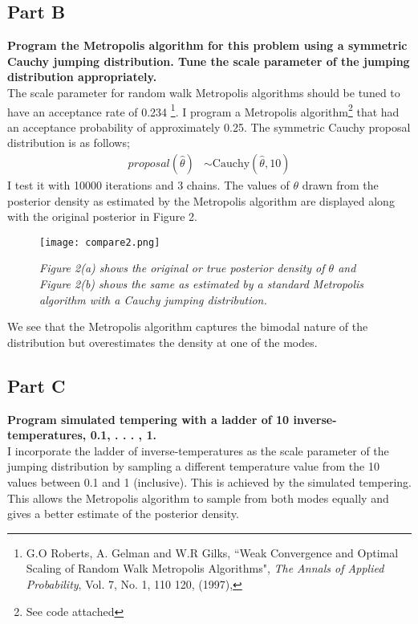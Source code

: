 \documentclass{article}
\begin{document}
\subsection{Part B}
\textbf{Program the Metropolis algorithm for this problem using a symmetric Cauchy jumping distribution. Tune the scale parameter of the jumping distribution appropriately.}\\
The scale parameter for random walk Metropolis algorithms should be tuned to have an acceptance rate of 0.234 \footnote{G.O Roberts, A. Gelman and W.R Gilks, ``Weak Convergence and Optimal Scaling of
Random Walk Metropolis Algorithms", \textit{The Annals of Applied Probability}, Vol. 7, No. 1, 110 120,   (1997), }. I program a Metropolis algorithm\footnote{See code attached} that had an acceptance probability of approximately 0.25. The symmetric Cauchy proposal distribution is as 
follows;
\begin{align*}
proposal(\hat{\theta}) &\sim \text{Cauchy}(\hat{\theta}, 10)
\end{align*}
I test it with 10000 iterations and 3 chains. The values of $\theta$ drawn from the posterior density as estimated by the Metropolis algorithm are displayed along with the original posterior in Figure 2.
 \begin{figure}[H]
\centering
\texttt{[image: compare2.png]}
\caption{\textit{Figure 2(a) shows the original or true posterior density of $\theta$ and Figure 2(b) shows the same as estimated by a standard Metropolis algorithm with a Cauchy jumping distribution.}}
\label{deltat}
\end{figure}
We see that the Metropolis algorithm captures the bimodal nature of the distribution but overestimates the density at one of the modes.
\subsection{Part C}
\textbf{Program simulated tempering with a ladder of 10 inverse-temperatures, 0.1, . . . , 1.}\\
I incorporate the ladder of inverse-temperatures as the scale parameter of the jumping distribution by sampling a different temperature value from the 10 values between 0.1 and 1 (inclusive). This is achieved by the simulated tempering. This allows the Metropolis algorithm to sample from both modes equally and gives a better estimate of the posterior density. 
\end{document}
